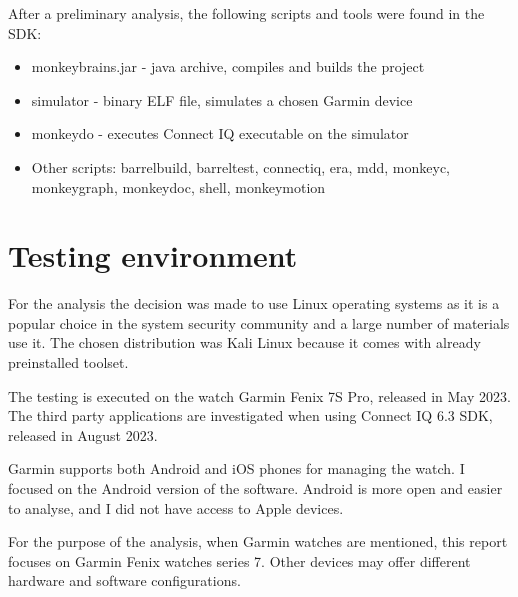 After a preliminary analysis, the following scripts and tools were found in the SDK:

\begin{itemize}
    \item monkeybrains.jar - java archive, compiles and builds the project
    \item simulator - binary ELF file, simulates a chosen Garmin device
    \item monkeydo - executes Connect IQ executable on the simulator
    \item Other scripts: barrelbuild, barreltest, connectiq, era, mdd, monkeyc, monkeygraph, monkeydoc, shell, monkeymotion
\end{itemize}

\section{Testing environment}
For the analysis the decision was made to use Linux operating systems as it is a popular choice in the system security community and a large number of materials use it.
The chosen distribution was Kali Linux because it comes with already preinstalled toolset.

The testing is executed on the watch Garmin Fenix 7S Pro, released in May 2023.
The third party applications are investigated when using Connect IQ 6.3 SDK, released in August 2023.

Garmin supports both Android and iOS phones for managing the watch.
I focused on the Android version of the software.
Android is more open and easier to analyse, and I did not have access to Apple devices.


For the purpose of the analysis, when Garmin watches are mentioned, this report focuses on Garmin Fenix watches series 7.
Other devices may offer different hardware and software configurations.



